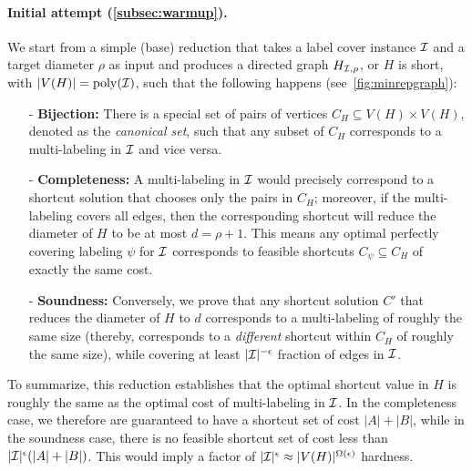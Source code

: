 \paragraph{Initial attempt (\cref{subsec:warmup}).} We start from a simple (base) reduction that takes a label cover instance $\mathcal{I}$ and a target diameter $\rho$  as input and produces a directed graph $H_{\mathcal{I}, \rho}$, or $H$ is short,  with $|V(H)| = \mathrm{poly}(\mathcal{I})$, such that the following happens (see~\cref{fig:minrepgraph}):
\begin{enumerate}
    \item[-] \textbf{Bijection:} There is a special set of pairs of vertices $C_H \subseteq V(H) \times V(H)$, denoted as the \textit{canonical set}, such that any subset of $C_H$ corresponds to a multi-labeling in $\mathcal{I}$ and vice versa.

    \item[-] \textbf{Completeness:} A multi-labeling in $\mathcal{I}$ would precisely correspond to a shortcut solution that chooses only the pairs in $C_H$; moreover, if the multi-labeling covers all edges, then the corresponding shortcut will reduce the diameter of $H$ to be at most $d=\rho+1$. This means any optimal perfectly covering labeling $\psi$ for $\mathcal{I}$ corresponds to feasible shortcuts $C_{\psi} \subseteq C_H$ of exactly the same cost. 

    \item[-] \textbf{Soundness:} Conversely, we prove that any shortcut solution $C'$ that reduces the diameter of $H$ to $d$ corresponds to a multi-labeling of roughly the same size (thereby, corresponds to a \textit{different} shortcut within $C_H$ of roughly the same size), while covering at least $|\mathcal{I}|^{-\epsilon}$ fraction of edges in $\mathcal{I}$.
\end{enumerate}




To summarize, this reduction establishes that the optimal shortcut value in $H$ is roughly the same as the optimal cost of multi-labeling in $\mathcal{I}$. In the completeness case, we therefore are guaranteed to have a shortcut set of cost $|A|+|B|$, while in the soundness case, there is no feasible shortcut set of cost less than $|\mathcal{I}|^{\epsilon}(|A|+|B|)$. This would imply a factor of $|\mathcal{I}|^{\epsilon} \approx |V(H)|^{\Omega(\epsilon)}$ hardness.

